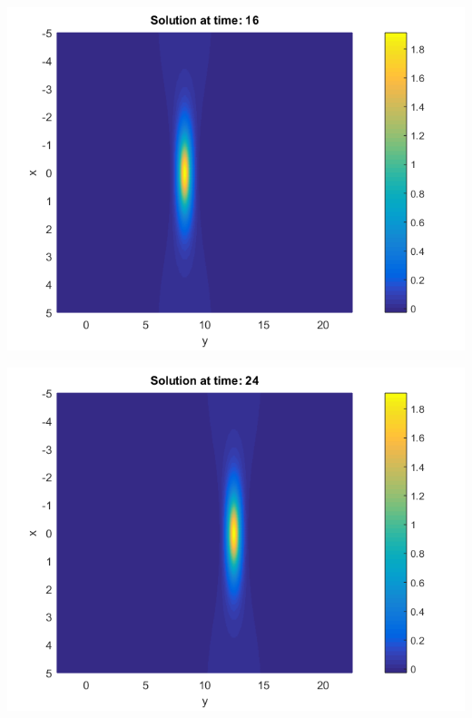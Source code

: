 \documentclass{beamer}
\begin{document}
\begin{frame}
\begin{center}
\begin{minipage}[b]{0.30\linewidth}
		 \includegraphics[width=\linewidth]{../amitans/figures/Solution_bt3_t=16.png}
	\end{minipage}
	\begin{minipage}[b]{0.30\linewidth}
		\includegraphics[width=\linewidth]{../amitans/figures/Solution_bt3_t=24.png}
	\end{minipage}	
	\begin{minipage}[b]{0.30\linewidth}

\end{minipage}
\end{center}
\end{frame}
\end{document}
